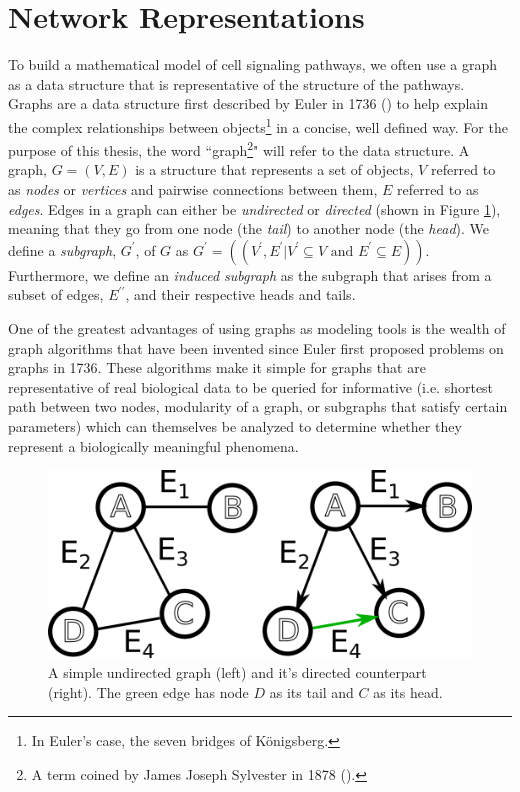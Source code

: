 \documentclass[12pt,twoside]{reedthesis}
\theoremstyle{definition}
\begin{document}
 \section{Network Representations}

  To build a mathematical model of cell signaling pathways, we often use a graph as a data structure that is representative of the structure of the pathways. Graphs are a data structure first described by Euler in 1736 (\cite{Shields2012}) to help explain the complex relationships between objects\footnote{In Euler's case, the seven bridges of K\"{o}nigsberg.} in a concise, well defined way. For the purpose of this thesis, the word ``graph\footnote{A term coined by James Joseph Sylvester in 1878 (\cite{Biggs1986}).}" will refer to the data structure. A graph, $G=(V,E)$ is a structure that represents a set of objects, $V$ referred to as \textit{nodes} or \textit{vertices} and pairwise connections between them, $E$ referred to as \textit{edges}. Edges in a graph can either be \textit{undirected} or \textit{directed} (shown in Figure \ref{fig:simple_graph_du}), meaning that they go from one node (the \textit{tail}) to another node (the \textit{head}). We define a \textit{subgraph}, $G^\prime$, of $G$ as $G^\prime=((V^\prime,E^\prime | V^\prime \subseteq V \text{ and } E^\prime \subseteq E))$. Furthermore, we define an \textit{induced subgraph} as the subgraph that arises from a subset of edges, $E^{\prime\prime}$, and their respective heads and tails.\par

  One of the greatest advantages of using graphs as modeling tools is the wealth of graph algorithms that have been invented since Euler first proposed problems on graphs in 1736. These algorithms make it simple for graphs that are representative of real biological data to be queried for informative (i.e. shortest path between two nodes, modularity of a graph, or subgraphs that satisfy certain parameters) which can themselves be analyzed to determine whether they represent a biologically meaningful phenomena.\par

  \begin{figure}[!h]
    \begin{center}
      \includegraphics[width=\textwidth/2]{simple_graph_du}
    \caption[Undirected \& Directed Graphs]{A simple undirected graph (left) and it's directed counterpart (right). The green edge has node $D$ as its tail and $C$ as its head.}
    \label{fig:simple_graph_du}
    \end{center}
  \end{figure}
\end{document}
